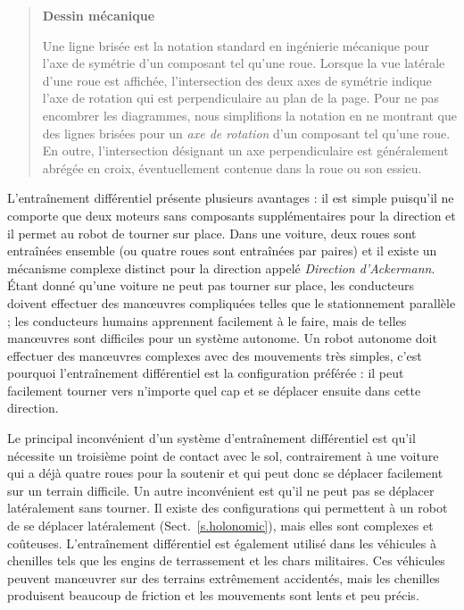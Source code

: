 {\begin{quote}
\begin{center}
\textbf{Dessin mécanique}
\end{center}
Une ligne brisée est la notation standard en ingénierie mécanique pour l'axe de symétrie d'un composant tel qu'une roue. Lorsque la vue latérale d'une roue est affichée, l'intersection des deux axes de symétrie indique l'axe de rotation qui est perpendiculaire au plan de la page. Pour ne pas encombrer les diagrammes, nous simplifions la notation en ne montrant que des lignes brisées pour un \emph{axe de rotation} d'un composant tel qu'une roue. En outre, l'intersection désignant un axe perpendiculaire est généralement abrégée en croix, éventuellement contenue dans la roue ou son essieu.
\end{quote}

L'entraînement différentiel présente plusieurs avantages : il est simple puisqu'il ne comporte que deux moteurs sans composants supplémentaires pour la direction et il permet au robot de tourner sur place. Dans une voiture, deux roues sont entraînées ensemble (ou quatre roues sont entraînées par paires) et il existe un mécanisme complexe distinct pour la direction appelé \emph{Direction d'Ackermann}. Étant donné qu'une voiture ne peut pas tourner sur place, les conducteurs doivent effectuer des manœuvres compliquées telles que le stationnement parallèle ; les conducteurs humains apprennent facilement à le faire, mais de telles manœuvres sont difficiles pour un système autonome. Un robot autonome doit effectuer des manœuvres complexes avec des mouvements très simples, c'est pourquoi l'entraînement différentiel est la configuration préférée : il peut facilement tourner vers n'importe quel cap et se déplacer ensuite dans cette direction.

Le principal inconvénient d'un système d'entraînement différentiel est qu'il nécessite un troisième point de contact avec le sol, contrairement à une voiture qui a déjà quatre roues pour la soutenir et qui peut donc se déplacer facilement sur un terrain difficile. Un autre inconvénient est qu'il ne peut pas se déplacer latéralement sans tourner. Il existe des configurations qui permettent à un robot de se déplacer latéralement (Sect.~\ref{s.holonomic}), mais elles sont complexes et coûteuses. L'entraînement différentiel est également utilisé dans les véhicules à chenilles tels que les engins de terrassement et les chars militaires. Ces véhicules peuvent manœuvrer sur des terrains extrêmement accidentés, mais les chenilles produisent beaucoup de friction et les mouvements sont lents et peu précis.

}
